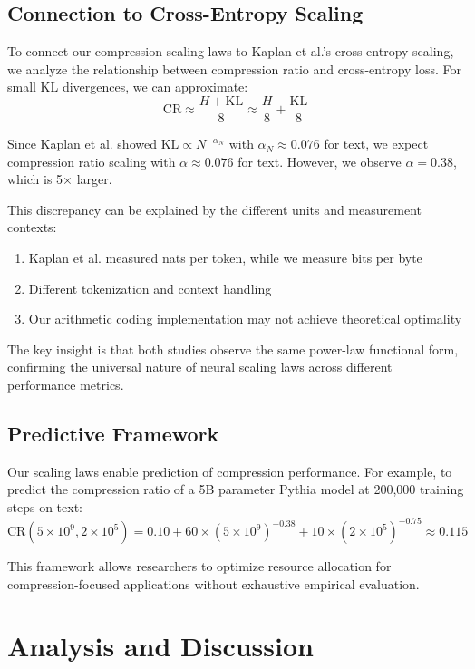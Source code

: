 \documentclass[11pt]{article}
\begin{document}
\subsection{Connection to Cross-Entropy Scaling}

To connect our compression scaling laws to Kaplan et al.'s cross-entropy scaling, we analyze the relationship between compression ratio and cross-entropy loss. For small KL divergences, we can approximate:
\[
\mathrm{CR} \approx \frac{H + \mathrm{KL}}{8} \approx \frac{H}{8} + \frac{\mathrm{KL}}{8}
\]

Since Kaplan et al. showed $\mathrm{KL} \propto N^{-\alpha_N}$ with $\alpha_N \approx 0.076$ for text, we expect compression ratio scaling with $\alpha \approx 0.076$ for text. However, we observe $\alpha = 0.38$, which is 5× larger.

This discrepancy can be explained by the different units and measurement contexts:
\begin{enumerate}
\item Kaplan et al. measured nats per token, while we measure bits per byte
\item Different tokenization and context handling
\item Our arithmetic coding implementation may not achieve theoretical optimality
\end{enumerate}

The key insight is that both studies observe the same power-law functional form, confirming the universal nature of neural scaling laws across different performance metrics.

\subsection{Predictive Framework}

Our scaling laws enable prediction of compression performance. For example, to predict the compression ratio of a 5B parameter Pythia model at 200,000 training steps on text:
\[
\mathrm{CR}(5 \times 10^9, 2 \times 10^5) = 0.10 + 60 \times (5 \times 10^9)^{-0.38} + 10 \times (2 \times 10^5)^{-0.75} \approx 0.115
\]

This framework allows researchers to optimize resource allocation for compression-focused applications without exhaustive empirical evaluation.

\section{Analysis and Discussion}
\end{document}
